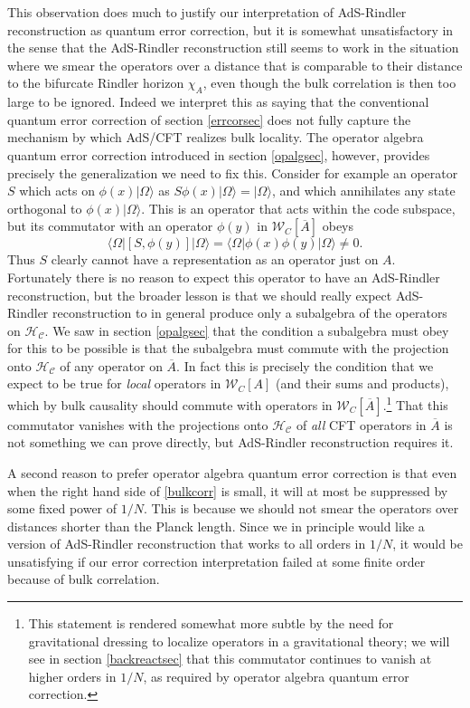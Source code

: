 \documentclass[12pt]{article}
\newcommand{\be}{\begin{equation}}
\newcommand{\ee}{\end{equation}}
\newcommand{\HC}{\mathcal{H}_{\mathcal{C}}}
\newcommand{\lan}{\langle}
\newcommand{\ran}{\rangle}
\newcommand{\W}{\mathcal{W}}
\newcommand{\ol}{\overline}
\begin{document}
This observation does much to justify our interpretation of AdS-Rindler reconstruction as quantum error correction, but it is somewhat unsatisfactory in the sense that the AdS-Rindler reconstruction still seems to work in the situation where we smear the operators over a distance that is comparable to their distance to the bifurcate Rindler horizon $\chi_A$, even though the bulk correlation is then too large to be ignored.  Indeed we interpret this as saying that the conventional quantum error correction of section \ref{errcorsec} does not fully capture the mechanism by which AdS/CFT realizes bulk locality.  The operator algebra quantum error correction introduced in section \ref{opalgsec}, however, provides precisely the generalization we need to fix this.  Consider for example an operator $S$ which acts on $\phi(x)|\Omega\ran$ as $S\phi(x)|\Omega\ran=|\Omega\ran$, and which annihilates any state orthogonal to $\phi(x)|\Omega\ran$.  This is an operator that acts within the code subspace, but its commutator with an operator $\phi(y)$ in $\W_C[\ol{A}]$ obeys
\be
\lan \Omega|[S,\phi(y)]|\Omega\ran=\lan \Omega |\phi(x)\phi(y)|\Omega\ran\neq 0.
\ee 
Thus $S$ clearly cannot have a representation as an operator just on $A$.  Fortunately there is no reason to expect this operator to have an AdS-Rindler reconstruction, but the broader lesson is that we should really expect AdS-Rindler reconstruction to in general produce only a subalgebra of the operators on $\HC$.  We saw in section \ref{opalgsec} that the condition a subalgebra must obey for this to be possible is that the subalgebra must commute with the projection onto $\HC$ of any operator on $\ol{A}$.  In fact this is precisely the condition that we expect to be true for \textit{local} operators in $\W_C[A]$ (and their sums and products), which by bulk causality should commute with operators in $\W_C[\ol{A}]$.\footnote{This statement is rendered somewhat more subtle by the need for gravitational dressing to localize operators in a gravitational theory; we will see in section \ref{backreactsec} that this commutator continues to vanish at higher orders in $1/N$, as required by operator algebra quantum error correction.}  That this commutator vanishes with the projections onto $\HC$ of \textit{all} CFT operators in $\ol{A}$ is not something we can prove directly, but AdS-Rindler reconstruction requires it.

A second reason to prefer operator algebra quantum error correction is that even when the right hand side of \eqref{bulkcorr} is small, it will at most be suppressed by some fixed power of $1/N$.  This is because we should not smear the operators over distances shorter than the Planck length.  Since we in principle would like a version of AdS-Rindler reconstruction that works to all orders in $1/N$, it would be unsatisfying if our error correction interpretation failed at some finite order because of bulk correlation.  
\end{document}

